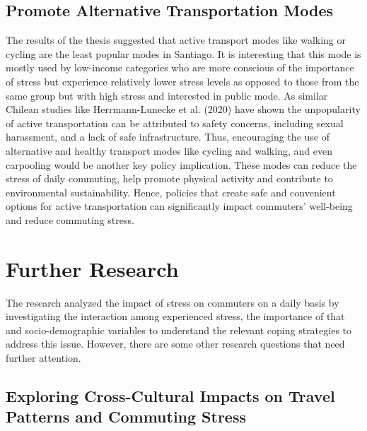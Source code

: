 \documentclass[
11pt, %
oneside, %
english, %
singlespacing, %
]{macthesis} %
\begin{document}
\hypertarget{promote-alternative-transportation-modes}{%
\subsection{Promote Alternative Transportation Modes}\label{promote-alternative-transportation-modes}}

The results of the thesis suggested that active transport modes like walking or cycling are the least popular modes in Santiago. It is interesting that this mode is mostly used by low-income categories who are more conscious of the importance of stress but experience relatively lower stress levels as opposed to those from the same group but with high stress and interested in public mode. As similar Chilean studies like Herrmann-Lunecke et al. (2020) have shown the unpopularity of active transportation can be attributed to safety concerns, including sexual harassment, and a lack of safe infrastructure. Thus, encouraging the use of alternative and healthy transport modes like cycling and walking, and even carpooling would be another key policy implication. These modes can reduce the stress of daily commuting, help promote physical activity and contribute to environmental sustainability. Hence, policies that create safe and convenient options for active transportation can significantly impact commuters' well-being and reduce commuting stress.

\hypertarget{further-research}{%
\section{Further Research}\label{further-research}}

The research analyzed the impact of stress on commuters on a daily basis by investigating the interaction among experienced stress, the importance of that and socio-demographic variables to understand the relevant coping strategies to address this issue. However, there are some other research questions that need further attention.

\hypertarget{exploring-cross-cultural-impacts-on-travel-patterns-and-commuting-stress}{%
\subsection{Exploring Cross-Cultural Impacts on Travel Patterns and Commuting Stress}\label{exploring-cross-cultural-impacts-on-travel-patterns-and-commuting-stress}}
\end{document}
